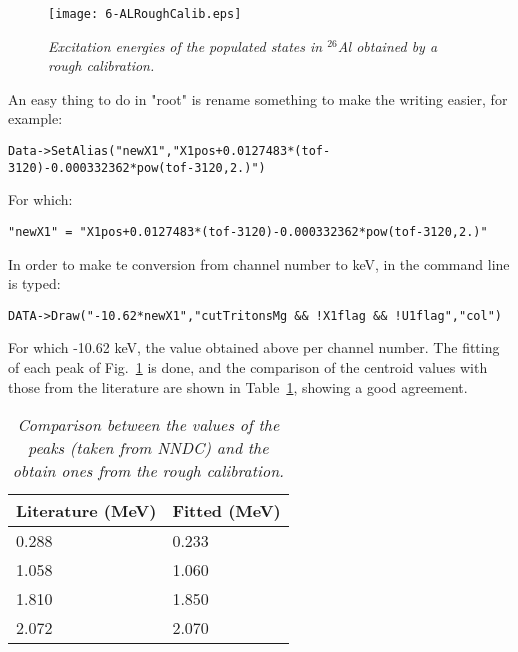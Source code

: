 \documentclass[11pt]{report}
\begin{document}
\begin{figure}[h]
 \begin{center}
\texttt{[image: 6-ALRoughCalib.eps]}  
 \end{center}
\vspace*{-4mm}
\caption{\label{fig:ALRoughCalib} \it Excitation energies of the populated states 
in $^{26}$Al obtained by a rough calibration.}
\end{figure}
\vspace*{4mm}

\noindent
An easy thing to do in "root" is rename something to make the writing easier, for example:
\begin{verbatim}
Data->SetAlias("newX1","X1pos+0.0127483*(tof-3120)-0.000332362*pow(tof-3120,2.)")
\end{verbatim}

\noindent
For which:
\begin{verbatim}
"newX1" = "X1pos+0.0127483*(tof-3120)-0.000332362*pow(tof-3120,2.)"
\end{verbatim}

\noindent
In order to make te conversion from channel number to keV, in the command line is typed:
\begin{verbatim}
DATA->Draw("-10.62*newX1","cutTritonsMg && !X1flag && !U1flag","col")
\end{verbatim}

\noindent
For which -10.62 keV, the value obtained above per channel number.
%
The fitting of each peak of Fig.~\ref{fig:ALRoughCalib} is done, and the comparison of the 
centroid values with those from the literature are shown in Table~\ref{tab:values}, 
showing a good agreement.\\  
                                                                                                                                          
\begin{table}[!th]
\centering
\begin{tabular}{|l|l|}
\hline
Literature (MeV)&Fitted (MeV)\\
\hline
0.288&0.233\\
1.058&1.060\\
1.810&1.850\\
2.072&2.070\\
\hline
\end{tabular}
\caption{\it Comparison between the values of the peaks (taken from NNDC) 
and the obtain ones from the rough calibration.}
\label{tab:values}
\end{table}
\end{document}
